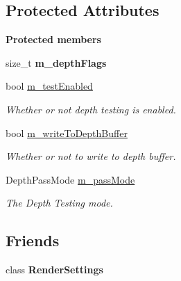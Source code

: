 \subsection*{Protected Attributes}
\begin{Indent}\textbf{ Protected members}\par
\begin{DoxyCompactItemize}
\item 
\mbox{\label{classrev_1_1_depth_setting_a6551af9878681437ce74e478bbadd1eb}} 
size\+\_\+t {\bfseries m\+\_\+depth\+Flags}
\item 
\mbox{\label{classrev_1_1_depth_setting_a5bb0e46014ecf2b8b40fd6527ca9fe3f}} 
bool \mbox{\hyperlink{classrev_1_1_depth_setting_a5bb0e46014ecf2b8b40fd6527ca9fe3f}{m\+\_\+test\+Enabled}}
\begin{DoxyCompactList}\small\item\em Whether or not depth testing is enabled. \end{DoxyCompactList}\item 
\mbox{\label{classrev_1_1_depth_setting_a050d51b7651941f9ea39c1fba3504206}} 
bool \mbox{\hyperlink{classrev_1_1_depth_setting_a050d51b7651941f9ea39c1fba3504206}{m\+\_\+write\+To\+Depth\+Buffer}}
\begin{DoxyCompactList}\small\item\em Whether or not to write to depth buffer. \end{DoxyCompactList}\item 
\mbox{\label{classrev_1_1_depth_setting_af0ec93411945075f4b0a0eb4d3926dec}} 
Depth\+Pass\+Mode \mbox{\hyperlink{classrev_1_1_depth_setting_af0ec93411945075f4b0a0eb4d3926dec}{m\+\_\+pass\+Mode}}
\begin{DoxyCompactList}\small\item\em The Depth Testing mode. \end{DoxyCompactList}\end{DoxyCompactItemize}
\end{Indent}
\subsection*{Friends}
\begin{DoxyCompactItemize}
\item 
\mbox{\label{classrev_1_1_depth_setting_abf433a9c39697ef25510a90f4cf565b0}} 
class {\bfseries Render\+Settings}
\end{DoxyCompactItemize}
